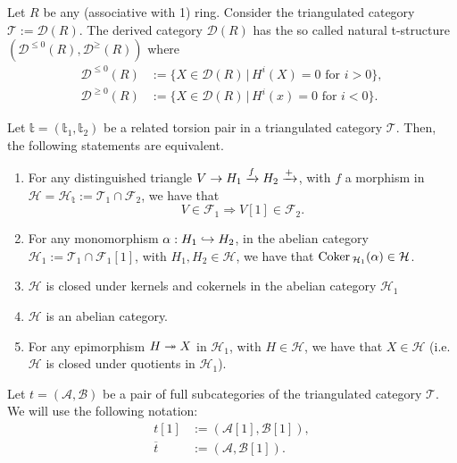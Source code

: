 \begin{example}
  Let $R$ be any (associative with 1) ring. Consider the triangulated category $\mathcal{T}:=\mathcal{D}(R)$.
  The derived category $\mathcal{D}(R)$ has the so called natural t-structure
  $(\mathcal{D}^{\leq 0}(R),\mathcal{D}^{\geq}(R))$ where
  \begin{align*}
    \mathcal{D}^{\leq 0}(R) &:= \{ X\in\mathcal{D}(R) \,|\,H^i(X)=0\text{ for } i>0\},\\
    \mathcal{D}^{\geq 0}(R) &:= \{ X\in\mathcal{D}(R) \,|\,H^i(x)=0\text{ for } i<0\}.
  \end{align*}
\end{example}

\begin{thm}\label{thm:2.9}
  Let $\mathbb{t}=(\mathbb{t}_1,\mathbb{t}_2)$ be a related torsion pair in a triangulated
  category $\mathcal{T}$. Then, the following statements are equivalent.
  \begin{enumerate}[label=(\alph*)]
    \item For any distinguished triangle $V\to H_1\xrightarrow{f}H_2\xrightarrow{+}$, with
      $f$ a morphism in $\mathcal{H}=\mathcal{H}_\mathbb{t}:=\mathcal{T}_1\cap\mathcal{F}_2$,
      we have that
      \begin{equation*}
        V\in\mathcal{F}_1 \Rightarrow V[1]\in\mathcal{F}_2.
      \end{equation*}
    \item For any monomorphism $\alpha:H_1\hookrightarrow H_2$, in the abelian category
      $\mathcal{H}_1:=\mathcal{T}_1\cap\mathcal{F}_1[1]$, with $H_1,H_2\in\mathcal{H}$,
      we have that $\mathrm{\textup{Coker\,}}_{\mathcal{H}_1}(\alpha)\in\mathcal{H}$.
    \item $\mathcal{H}$ is closed under kernels and cokernels in the abelian category
      $\mathcal{H}_1$
    \item $\mathcal{H}$ is an abelian category.
    \item For any epimorphism $H\twoheadrightarrow X$ in $\mathcal{H}_1$, with $H\in\mathcal{H}$,
      we have that $X\in\mathcal{H}$ (i.e. $\mathcal{H}$ is closed under quotients in $\mathcal{H}_1$).
  \end{enumerate}
\end{thm}

Let $t=(\mathcal{A},\mathcal{B})$ be a pair of full subcategories of the triangulated
category $\mathcal{T}$. We will use the following notation:
\begin{align*}
  t[1] &:= (\mathcal{A}[1],\mathcal{B}[1]),\\
  \overline{t} &:= (\mathcal{A},\mathcal{B}[1]).
\end{align*}

